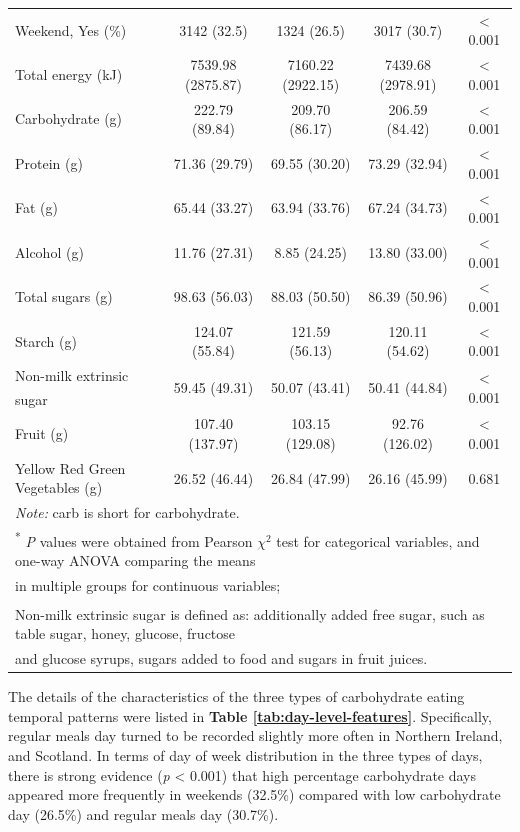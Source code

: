 \begin{table}
\begin{tabular}[t]{lcccc}
		\hspace{1em}Weekend, Yes (\%) & 3142 (32.5) & 1324 (26.5) & 3017 (30.7) & < 0.001\\
		Total energy (kJ) & 7539.98 (2875.87) & 7160.22 (2922.15) & 7439.68 (2978.91) & < 0.001\\
		Carbohydrate (g) & 222.79 (89.84) & 209.70 (86.17) & 206.59 (84.42) & < 0.001\\
		Protein (g) & 71.36 (29.79) & 69.55 (30.20) & 73.29 (32.94) & < 0.001\\
		Fat (g) & 65.44 (33.27) & 63.94 (33.76) & 67.24 (34.73) & < 0.001\\
		Alcohol (g) & 11.76 (27.31) & 8.85 (24.25) & 13.80 (33.00) & < 0.001\\
		Total sugars (g) & 98.63 (56.03) & 88.03 (50.50) & 86.39 (50.96) & < 0.001\\
		Starch (g) & 124.07 (55.84) & 121.59 (56.13) & 120.11 (54.62) & < 0.001\\
		Non-milk extrinsic sugar\textsuperscript{\dag} & 59.45 (49.31) & 50.07 (43.41) & 50.41 (44.84) & < 0.001\\
		Fruit (g) & 107.40 (137.97) & 103.15 (129.08) & 92.76 (126.02) & < 0.001\\
		Yellow Red Green Vegetables (g) & 26.52 (46.44) & 26.84 (47.99) & 26.16 (45.99) & 0.681\\
		\bottomrule
		\multicolumn{5}{l}{{\scriptsize \textit{Note:} carb is short for carbohydrate.}}\\
		\multicolumn{5}{l}{{\scriptsize \textsuperscript{*} \textit{P} values were obtained from Pearson $\chi^2$ test for categorical variables, and one-way ANOVA comparing the means}}\\
		\multicolumn{5}{l}{{\scriptsize  in multiple groups for continuous variables;}}\\
		\multicolumn{5}{l}{{\scriptsize \textsuperscript{\dag} Non-milk extrinsic sugar is defined as: additionally added free sugar, such as table sugar, honey, glucose, fructose}}\\ 
		\multicolumn{5}{l}{{\scriptsize and glucose syrups, sugars added to food and sugars in fruit juices.}}\\
	\end{tabular}
\end{table}

\vspace{-0.5cm}

The details of the characteristics of the three types of carbohydrate eating temporal patterns were listed in\textbf{ Table \ref{tab:day-level-features}}. Specifically, regular meals day turned to be recorded slightly more often in Northern Ireland, and Scotland. In terms of day of week distribution in the three types of days, there is strong evidence (\textit{p} < 0.001) that high percentage carbohydrate days appeared more frequently in weekends (32.5\%) compared with low carbohydrate day (26.5\%) and regular meals day (30.7\%).

